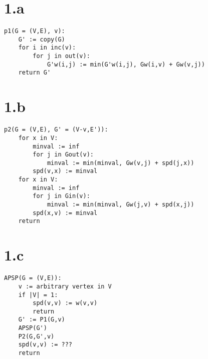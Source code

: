 \documentclass{article}
\begin{document}
\section*{1.a}

\begin{verbatim}
p1(G = (V,E), v):
    G' := copy(G)
    for i in inc(v):
        for j in out(v):
            G'w(i,j) := min(G'w(i,j), Gw(i,v) + Gw(v,j))
    return G'
\end{verbatim}

\section*{1.b}

\begin{verbatim}
p2(G = (V,E), G' = (V-v,E')):
    for x in V:
        minval := inf
        for j in Gout(v):
            minval := min(minval, Gw(v,j) + spd(j,x))
        spd(v,x) := minval
    for x in V:
        minval := inf
        for j in Gin(v):
            minval := min(minval, Gw(j,v) + spd(x,j))
        spd(x,v) := minval
    return
\end{verbatim}

\section*{1.c}

\begin{verbatim}
APSP(G = (V,E)):
    v := arbitrary vertex in V
    if |V| = 1:
        spd(v,v) := w(v,v)
        return
    G' := P1(G,v)
    APSP(G')
    P2(G,G',v)
    spd(v,v) := ???
    return 
\end{verbatim}
\end{document}
